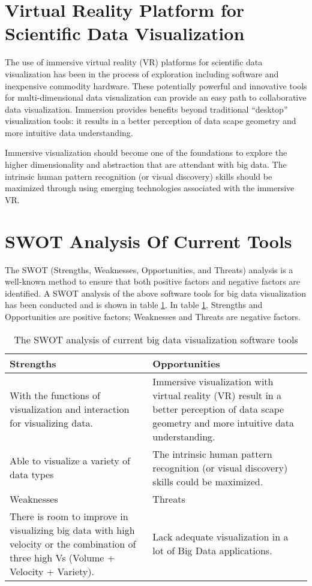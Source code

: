 \section{Virtual Reality Platform for Scientific Data Visualization}
The use of immersive virtual reality (VR) platforms for scientific data visualization has been in the process of exploration including software and inexpensive commodity hardware. These potentially powerful and innovative tools for multi-dimensional data visualization can provide an easy path to collaborative data visualization. Immersion provides benefits beyond traditional “desktop” visualization tools: it results in a better perception of data scape geometry and more intuitive data understanding.
\par
Immersive visualization should become one of the foundations to explore the higher dimensionality and abstraction that are attendant with big data. The intrinsic human pattern recognition (or visual discovery) skills should be maximized through using emerging technologies associated with the immersive VR.
\section{SWOT Analysis Of Current Tools}
The SWOT (Strengths, Weaknesses, Opportunities, and Threats) analysis is a well-known method to ensure that both positive factors and negative factors are identified. A SWOT analysis of the above software tools for big data visualization has been conducted and is shown in table \ref{table:2}. In table \ref{table:2}, Strengths and Opportunities are positive factors; Weaknesses and Threats are negative factors.
\begin{table}[h!]
	\centering
	\begin{tabular}[c]{ |p{6cm}|p{6cm}|}
		\hline
		
		Strengths&Opportunities\\
		\hline
		 With the functions of visualization and interaction for visualizing data.& Immersive visualization with virtual reality (VR) result in a better perception of data scape geometry and more intuitive data understanding.\\
		 \hline
		 Able to visualize a variety of data types&The intrinsic human pattern recognition (or visual discovery) skills
		 could be maximized.\\
		\hline
		\hline
		Weaknesses&Threats\\
		\hline
		There is room to improve in visualizing big data with high velocity or
		the combination of three high Vs (Volume + Velocity + Variety).&Lack adequate visualization in a lot of Big Data applications.\\
		\hline
	\end{tabular}
	\caption{The SWOT analysis of current big data visualization software tools}
	\label{table:2}
\end{table}

